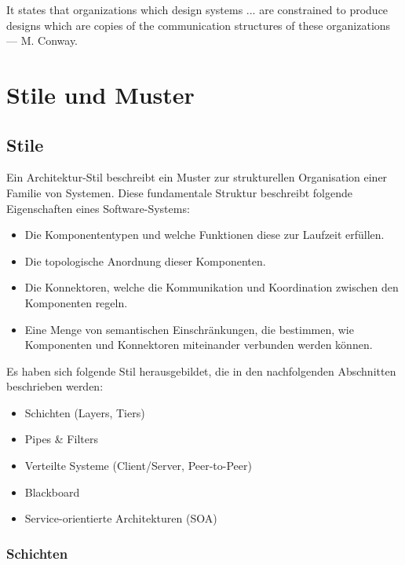 It states that organizations which design systems ... are constrained to produce designs which are copies of the communication structures of these organizations — M. Conway.

\section{Stile und Muster}

\subsection{Stile}

Ein Architektur-Stil beschreibt ein Muster zur strukturellen Organisation einer Familie von Systemen. Diese fundamentale Struktur beschreibt folgende Eigenschaften eines Software-Systems:
\begin{itemize}
	\item Die Komponententypen und welche Funktionen diese zur Laufzeit erfüllen.
	\item Die topologische Anordnung dieser Komponenten.
	\item Die Konnektoren, welche die Kommunikation und Koordination zwischen den Komponenten regeln.
	\item Eine Menge von semantischen Einschränkungen, die bestimmen, wie Komponenten und Konnektoren miteinander verbunden werden können.
\end{itemize}
Es haben sich folgende Stil herausgebildet, die in den nachfolgenden Abschnitten beschrieben werden:
\begin{itemize}
	\item Schichten (Layers, Tiers)
	\item Pipes \& Filters
	\item Verteilte Systeme (Client/Server, Peer-to-Peer)
	\item Blackboard
	\item Service-orientierte Architekturen (SOA)
\end{itemize}

\subsubsection{Schichten}

